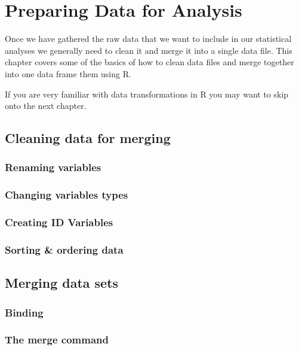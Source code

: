



\chapter{Preparing Data for Analysis}\label{DataClean}


Once we have gathered the raw data that we want to include in our statistical analyses we generally need to clean it and merge it into a single data file. This chapter covers some of the basics of how to clean data files and merge together into one data frame them using R. 

If you are very familiar with data transformations in R you may want to skip onto the next chapter. 

\section{Cleaning data for merging}

\subsection{Renaming variables}

\subsection{Changing variables types}

\subsection{Creating ID Variables}

\subsection{Sorting \& ordering data}

\section{Merging data sets}

\subsection{Binding}

\subsection{The merge command}
